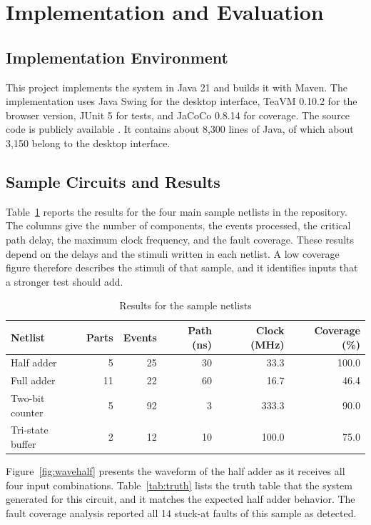 \section{Implementation and Evaluation}
\label{sec:evaluation}

\subsection{Implementation Environment}

This project implements the system in Java 21 and builds it with Maven.
The implementation uses Java Swing for the desktop interface, TeaVM 0.10.2 for the browser version, JUnit 5 for tests, and JaCoCo 0.8.14 for coverage.
The source code is publicly available .
It contains about 8,300 lines of Java, of which about 3,150 belong to the desktop interface.

\subsection{Sample Circuits and Results}

Table~\ref{tab:samples} reports the results for the four main sample netlists in the repository.
The columns give the number of components, the events processed, the critical path delay, the maximum clock frequency, and the fault coverage.
These results depend on the delays and the stimuli written in each netlist.
A low coverage figure therefore describes the stimuli of that sample, and it identifies inputs that a stronger test should add.

\begin{table}[H]
\centering
\small
\caption{Results for the sample netlists}
\label{tab:samples}
\begin{tabular}{lrrrrr}
\toprule
\textbf{Netlist} & \textbf{Parts} & \textbf{Events} & \textbf{Path (ns)} & \textbf{Clock (MHz)} & \textbf{Coverage (\%)} \\
\midrule
Half adder & 5 & 25 & 30 & 33.3 & 100.0 \\
Full adder & 11 & 22 & 60 & 16.7 & 46.4 \\
Two-bit counter & 5 & 92 & 3 & 333.3 & 90.0 \\
Tri-state buffer & 2 & 12 & 10 & 100.0 & 75.0 \\
\bottomrule
\end{tabular}
\end{table}

Figure~\ref{fig:wavehalf} presents the waveform of the half adder as it receives all four input combinations.
Table~\ref{tab:truth} lists the truth table that the system generated for this circuit, and it matches the expected half adder behavior.
The fault coverage analysis reported all 14 stuck-at faults of this sample as detected.

